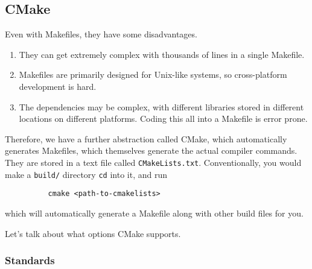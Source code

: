 \documentclass{article}
\begin{document}
  \subsection{CMake}

      Even with Makefiles, they have some disadvantages. 
      \begin{enumerate}
        \item They can get extremely complex with thousands of lines in a single Makefile. 
        \item Makefiles are primarily designed for Unix-like systems, so cross-platform development is hard. 
        \item The dependencies may be complex, with different libraries stored in different locations on different platforms. Coding this all into a Makefile is error prone. 
      \end{enumerate}

      \begin{definition}[CMake]
        Therefore, we have a further abstraction called CMake, which automatically generates Makefiles, which themselves generate the actual compiler commands. They are stored in a text file called \texttt{CMakeLists.txt}. Conventionally, you would make a \texttt{build/} directory \texttt{cd} into it, and run 
        \begin{lstlisting}
          cmake <path-to-cmakelists> 
        \end{lstlisting} 
        which will automatically generate a Makefile along with other build files for you. 
      \end{definition} 

      Let's talk about what options CMake supports. 

    \subsubsection{Standards}
\end{document}

